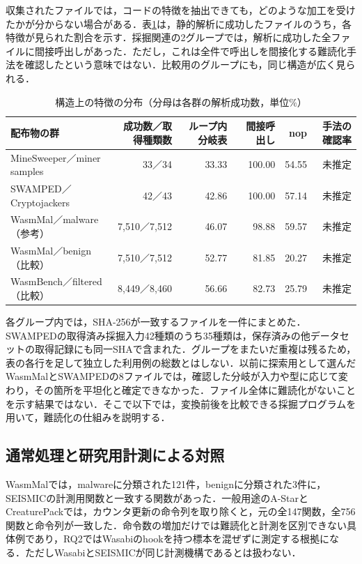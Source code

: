 \documentclass[submit,techrep]{ipsj}
\begin{document}
収集されたファイルでは，コードの特徴を抽出できても，どのような加工を受けたかが分からない場合がある．表\ref{tab:features}は，静的解析に成功したファイルのうち，各特徴が見られた割合を示す．採掘関連の2グループでは，解析に成功した全ファイルに間接呼出しがあった．ただし，これは全件で呼出しを間接化する難読化手法を確認したという意味ではない．比較用のグループにも，同じ構造が広く見られる．
\begin{table}[t]
\caption{構造上の特徴の分布（分母は各群の解析成功数，単位\%）}
\label{tab:features}
\centering\small
\begin{tabular}{lrrrrr}
\hline
配布物の群 & 成功数／取得種類数 & ループ内分岐表 & 間接呼出し & nop & 手法の確認率 \\
\hline
MineSweeper／miner samples & 33／34 & 33.33 & 100.00 & 54.55 & 未推定 \\
SWAMPED／Cryptojackers & 42／43 & 42.86 & 100.00 & 57.14 & 未推定 \\
WasmMal／malware（参考） & 7,510／7,512 & 46.07 & 98.88 & 59.57 & 未推定 \\
WasmMal／benign（比較） & 7,510／7,512 & 52.77 & 81.85 & 20.27 & 未推定 \\
WasmBench／filtered（比較） & 8,449／8,460 & 56.66 & 82.73 & 25.79 & 未推定 \\
\hline
\end{tabular}
\end{table}
各グループ内では，SHA-256が一致するファイルを一件にまとめた．SWAMPEDの取得済み採掘入力42種類のうち35種類は，保存済みの他データセットの取得記録にも同一SHAで含まれた．グループをまたいだ重複は残るため，表の各行を足して独立した利用例の総数とはしない．以前に探索用として選んだWasmMalとSWAMPEDの8ファイルでは，確認した分岐が入力や型に応じて変わり，その箇所を平坦化と確定できなかった．ファイル全体に難読化がないことを示す結果ではない．そこで以下では，変換前後を比較できる採掘プログラムを用いて，難読化の仕組みを説明する．

\subsection{通常処理と研究用計測による対照}
\label{sec:rq1-controls}
WasmMalでは，malwareに分類された121件，benignに分類された3件に，SEISMICの計測用関数と一致する関数があった．一般用途のA-StarとCreaturePackでは，カウンタ更新の命令列を取り除くと，元の全147関数，全756関数と命令列が一致した．命令数の増加だけでは難読化と計測を区別できない具体例であり，RQ2ではWasabiのhookを持つ標本を混ぜずに測定する根拠になる．ただしWasabiとSEISMICが同じ計測機構であるとは扱わない．
\end{document}
